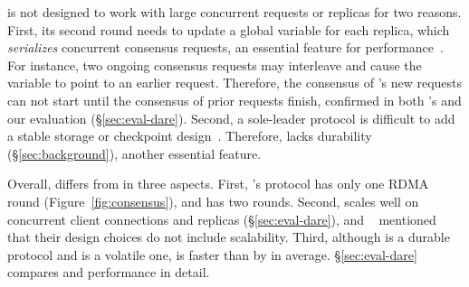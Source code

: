 

\dare is not designed to work with large concurrent requests or 
replicas for two reasons. First, its second round needs to update a global 
variable for each replica, which \emph{serializes} concurrent consensus 
requests, an essential feature for \paxos performance~\cite{paxos:practical}. 
For instance, two ongoing \dare consensus requests may interleave and cause the 
variable to point to an earlier request. Therefore, the consensus of \dare's 
new requests can not start until the consensus of prior requests finish, 
confirmed in both \dare's and our evaluation (\S\ref{sec:eval-dare}). Second, a 
sole-leader protocol is difficult to add a stable storage or 
checkpoint design~\cite{lyu1995software}. Therefore, \dare lacks durability 
(\S\ref{sec:background}), another essential \paxos 
feature.



Overall, \xxx differs from \dare in three aspects. First, \xxx's protocol has 
only one RDMA round (Figure~\ref{fig:consensus}), and \dare has two rounds. 
Second, \xxx scales well on concurrent client connections and replicas 
(\S\ref{sec:eval-dare}), and \dare~\cite{dare:hpdc15} mentioned that their 
design choices do not include scalability. Third, although \xxx is a durable 
protocol and \dare is a volatile one, \xxx is faster than \dare by \fasterDARE 
in average. \S\ref{sec:eval-dare} compares \xxx and \dare performance in 
detail.

